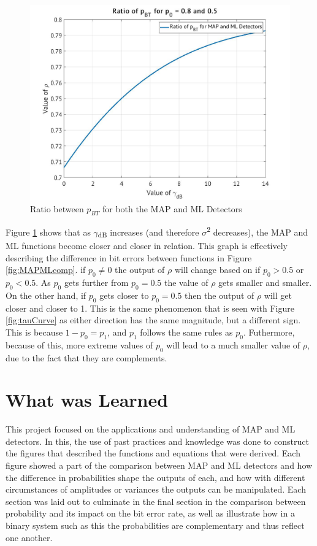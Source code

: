 \documentclass[a4paper, 11pt]{article}
\begin{document}
\pagebreak
\begin{figure}[htbp]
\centering
\includegraphics[width=.9\linewidth]{./Images/figure2_5b.jpg}
\caption{\label{fig:rhoChart}Ratio between \(p_{BT}\) for both the MAP and ML Detectors}
\end{figure}

Figure \ref{fig:rhoChart} shows that as \(\gamma\)\textsubscript{dB} increases (and therefore \(\sigma\)\textsuperscript{2} decreases), the MAP and ML functions become closer and closer in relation. This graph is effectively describing the difference in bit errors between functions in Figure \ref{fig:MAPMLcomp}.
if \(p_0 \neq 0\) the output of \(\rho\) will change based on if \(p_0 > 0.5\) or \(p_0 < 0.5\). As \(p_0\) gets further from \(p_0 = 0.5\) the value of \(\rho\) gets smaller and smaller. On the other hand, if \(p_0\) gets closer to \(p_0 = 0.5\) then the output of \(\rho\) will get closer and closer to 1.
This is the same phenomenon that is seen with Figure \ref{fig:tauCurve} as either direction has the same magnitude, but a different sign. This is because \(1 - p_0 = p_1\), and \(p_1\) follows the same rules as \(p_0\). Futhermore, because of this, more extreme values of \(p_0\) will lead to a much smaller value of \(\rho\), due to the fact that they are complements.

\section{What was Learned}
\label{sec:org7e9c1e8}
This project focused on the applications and understanding of MAP and ML detectors. In this, the use of past practices and knowledge was done to construct the figures that described the functions and equations that were derived. Each figure showed a part of the comparison between MAP and ML detectors and how the difference in probabilities shape the outputs of each, and how with different circumstances of amplitudes or variances the outputs can be manipulated.
Each section was laid out to culminate in the final section in the comparison between probability and its impact on the bit error rate, as well as illustrate how in a binary system such as this the probabilities are complementary and thus reflect one another.
\end{document}
